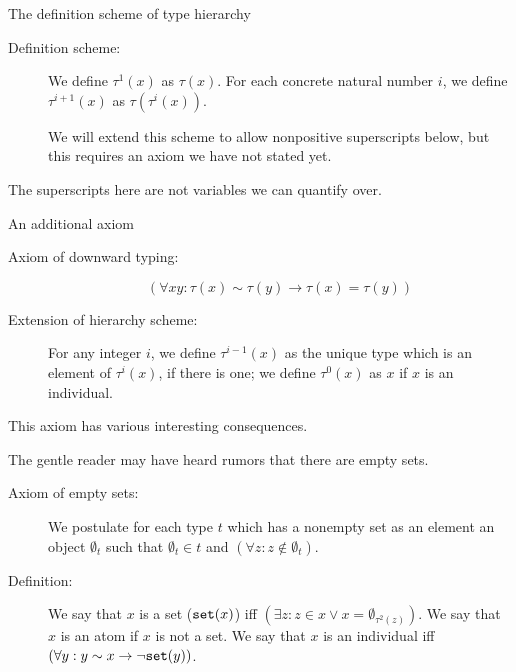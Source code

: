 \documentclass{slides}
\begin{document}
\begin{slide}

{\Large The definition scheme of type hierarchy}

\begin{description}


\item[Definition scheme:]  We define $\tau^1(x)$ as $\tau(x)$.  For each concrete natural number $i$, we define $\tau^{i+1}(x)$ as $\tau(\tau^i(x))$.

We will extend this scheme to allow nonpositive superscripts below, but this requires an axiom we have not stated yet.

\end{description}

The superscripts here are not variables we can quantify over.

\end{slide}

\begin{slide}
 {\Large An additional axiom}

\begin{description}

\item[Axiom of downward typing:]  $$(\forall xy: \tau(x) \sim \tau(y) \rightarrow \tau(x) = \tau(y))$$

\item[Extension of hierarchy scheme:]  For any integer $i$, we define $\tau^{i-1}(x)$ as the unique type which is an element of $\tau^i(x)$, if there is one; we define $\tau^0(x)$ as $x$ if $x$ is an individual.

\end{description}

This axiom has various interesting consequences.

\end{slide}

\begin{slide}

The gentle reader may have heard rumors that there are empty sets.

\begin{description}

\item[Axiom of empty sets:]  We postulate for each type $t$  which has a nonempty set as an element an object $\emptyset_{t}$ such that $\emptyset_{t}\in t$ and $(\forall z:z \not\in \emptyset_{t})$.

\item[Definition:]  We say that $x$ is a set (${\tt set}(x)$) iff $(\exists z:z \in x \vee x = \emptyset_{\tau^2(z)})$.  We say that $x$ is an atom if $x$ is not a set.  We say that $x$ is an individual iff
$(\forall y:y \sim x \rightarrow \neg {\tt set}(y))$.

\end{description}

\end{slide}
\end{document}
